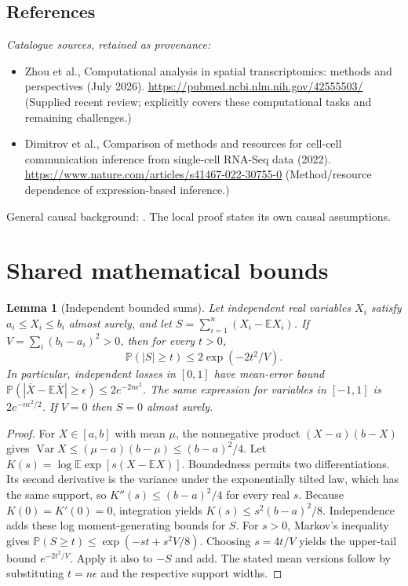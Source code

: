 \documentclass[11pt]{article}
\newcommand{\E}{\mathbb E}
\newcommand{\Prob}{\mathbb P}
\DeclareMathOperator{\Var}{Var}
\providecommand{\E}{\mathbb E}
\providecommand{\Prob}{\mathbb P}
\providecommand{\Var}{\operatorname{Var}}
\newtheorem{sharedlemma}{Lemma}[section]
\begin{document}
\subsection{References}
\noindent\emph{Catalogue sources, retained as provenance:}
\begin{itemize}
\item Zhou et al., Computational analysis in spatial transcriptomics: methods and perspectives (July 2026). \url{https://pubmed.ncbi.nlm.nih.gov/42555503/} (Supplied recent review; explicitly covers these computational tasks and remaining challenges.)
\item Dimitrov et al., Comparison of methods and resources for cell-cell communication inference from single-cell RNA-Seq data (2022). \url{https://www.nature.com/articles/s41467-022-30755-0} (Method/resource dependence of expression-based inference.)
\end{itemize}
\noindent General causal background: \cite{pearl}. The local proof states its own causal assumptions.
\clearpage


\appendix
\section{Shared mathematical bounds}\label{app:bounds}
\begin{sharedlemma}[Independent bounded sums]\label{lem:bounded}
Let independent real variables $X_i$ satisfy $a_i\leq X_i\leq b_i$ almost surely,
and let $S=\sum_{i=1}^n(X_i-\E X_i)$. If
$V=\sum_i(b_i-a_i)^2>0$, then for every $t>0$,
\[
 \Prob(|S|\geq t)\leq 2\exp(-2t^2/V).
\]
In particular, independent losses in $[0,1]$ have mean-error bound
$\Prob(|\overline X-\E\overline X|\geq\epsilon)
\leq2e^{-2n\epsilon^2}$. The same expression for variables in $[-1,1]$
is $2e^{-n\epsilon^2/2}$. If $V=0$ then $S=0$ almost surely.
\end{sharedlemma}
\begin{proof}
For $X\in[a,b]$ with mean $\mu$, the nonnegative product
$(X-a)(b-X)$ gives
$\Var X\leq(\mu-a)(b-\mu)\leq(b-a)^2/4$.
Let $K(s)=\log\E\exp[s(X-\E X)]$.
Boundedness permits two differentiations. Its second derivative is the variance
under the exponentially tilted law, which has the same support, so
$K''(s)\leq(b-a)^2/4$ for every real $s$.
Because $K(0)=K'(0)=0$, integration yields
$K(s)\leq s^2(b-a)^2/8$.
Independence adds these log moment-generating bounds for $S$.
For $s>0$, Markov's inequality gives
$\Prob(S\geq t)\leq\exp(-st+s^2V/8)$.
Choosing $s=4t/V$ yields the upper-tail bound $e^{-2t^2/V}$.
Apply it also to $-S$ and add. The stated mean versions follow by substituting
$t=n\epsilon$ and the respective support widths.
\end{proof}
\end{document}
